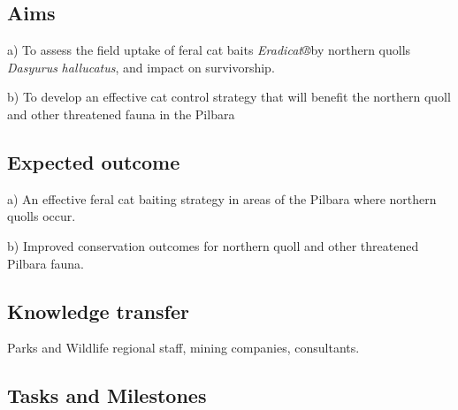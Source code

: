 \documentclass[version=last,
    paper=a4,                               %
    10pt,                                   %
    dvipsnames,
    oneside,                              %
    headings=openany,                       %
    open=any,
    BCOR=7mm,                               %
    DIV=15,     %
]{scrbook}
\begin{document}
\subsection*{Aims}

a) To assess the field uptake of feral cat baits \emph{Eradicat®}by
northern quolls \emph{Dasyurus} \emph{hallucatus}, and impact on
survivorship.

b) To develop an effective cat control strategy that will benefit the
northern quoll and other threatened fauna in the Pilbara




\subsection*{Expected outcome}

a) An effective feral cat baiting strategy in areas of the Pilbara where
northern quolls occur.

b) Improved conservation outcomes for northern quoll and other
threatened Pilbara fauna.




\subsection*{Knowledge transfer}

Parks and Wildlife regional staff, mining companies, consultants.




\subsection*{Tasks and Milestones}
\end{document}
